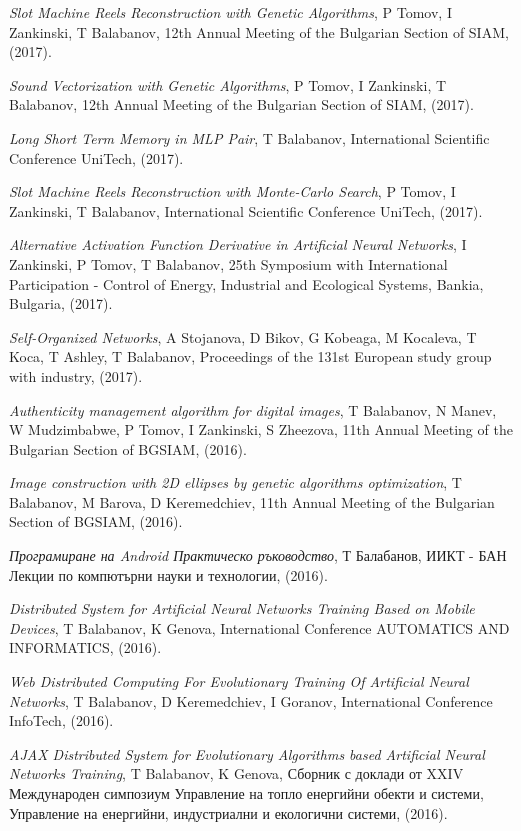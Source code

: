 \documentclass[bulgarian,a4paper]{europasscv}
\begin{document}
\begin{europasscv}
{\begin{ecvitemize}
    \item \textit{Slot Machine Reels Reconstruction with Genetic Algorithms}, P Tomov, I Zankinski, T Balabanov, 12th Annual Meeting of the Bulgarian Section of SIAM, (2017).
    \item \textit{Sound Vectorization with Genetic Algorithms}, P Tomov, I Zankinski, T Balabanov, 12th Annual Meeting of the Bulgarian Section of SIAM, (2017).
    \item \textit{Long Short Term Memory in MLP Pair}, T Balabanov, International Scientific Conference UniTech, (2017).
    \item \textit{Slot Machine Reels Reconstruction with Monte-Carlo Search}, P Tomov, I Zankinski, T Balabanov, International Scientific Conference UniTech, (2017).
    \item \textit{Alternative Activation Function Derivative in Artificial Neural Networks}, I Zankinski, P Tomov, T Balabanov, 25th Symposium with International Participation - Control of Energy, Industrial and Ecological Systems, Bankia, Bulgaria, (2017).
    \item \textit{Self-Organized Networks}, A Stojanova, D Bikov, G Kobeaga, M Kocaleva, T Koca, T Ashley, T Balabanov, Proceedings of the 131st European study group with industry, (2017).
    \item \textit{Authenticity management algorithm for digital images}, T Balabanov, N Manev, W Mudzimbabwe, P Tomov, I Zankinski, S Zheezova, 11th Annual Meeting of the Bulgarian Section of BGSIAM, (2016).
    \item \textit{Image construction with 2D ellipses by genetic algorithms optimization}, T Balabanov, M Barova, D Keremedchiev, 11th Annual Meeting of the Bulgarian Section of BGSIAM, (2016).
    \item \textit{Програмиране на Android Практическо ръководство}, Т Балабанов, ИИКТ - БАН Лекции по компютърни науки и технологии, (2016).
    \item \textit{Distributed System for Artificial Neural Networks Training Based on Mobile Devices}, T Balabanov, K Genova, International Conference AUTOMATICS AND INFORMATICS, (2016).
    \item \textit{Web Distributed Computing For Evolutionary Training Of Artificial Neural Networks}, T Balabanov, D Keremedchiev, I Goranov, International Conference InfoTech, (2016).
    \item \textit{AJAX Distributed System for Evolutionary Algorithms based Artificial Neural Networks Training}, T Balabanov, K Genova, Сборник с доклади от XXIV Международен симпозиум Управление на топло енергийни обекти и системи, Управление на енергийни, индустриални и екологични системи, (2016).

\end{ecvitemize}}
\end{europasscv}
\end{document}
